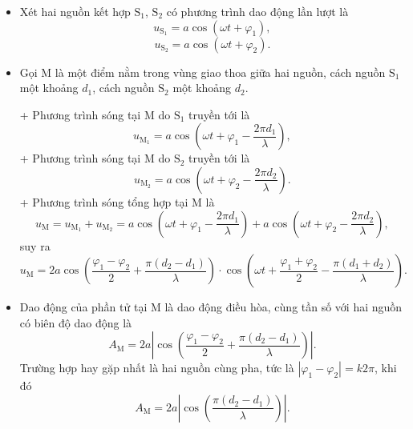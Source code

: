 \begin{itemize}
	\item Xét hai nguồn kết hợp $\text{S}_1$, $\text{S}_2$ có phương trình dao động lần lượt là 
	\begin{equation*}
		u_{\text{S}_1} = a \cos (\omega t + \varphi_1),
	\end{equation*}
	\begin{equation*}
		u_{\text{S}_2} = a \cos (\omega t + \varphi_2).
	\end{equation*}
	\item Gọi M là một điểm nằm trong vùng giao thoa giữa hai nguồn, cách nguồn $\text{S}_1$ một khoảng $d_1$, cách nguồn $\text{S}_2$ một khoảng $d_2$. 
	
	+ Phương trình sóng tại M do $\text{S}_1$ truyền tới là 
	\begin{equation*}
		u_{\text{M}_1} = a \cos \left(\omega t + \varphi_1 -\dfrac{2\pi d_1}{\lambda}\right),
	\end{equation*}
	+ Phương trình sóng tại M do $\text{S}_2$ truyền tới là 
	\begin{equation*}
		u_{\text{M}_2} = a \cos \left(\omega t + \varphi_2 -\dfrac{2\pi d_2}{\lambda}\right).
	\end{equation*}
	+ Phương trình sóng tổng hợp tại M là
	\begin{equation*}
		u_{\text{M}}=u_{\text{M}_1} + u_{\text{M}_2} = a \cos \left(\omega t + \varphi_1 -\dfrac{2\pi d_1}{\lambda}\right)+ a \cos \left(\omega t + \varphi_2 -\dfrac{2\pi d_2}{\lambda}\right), 
	\end{equation*}
	suy ra
	\begin{equation*}
		u_{\text{M}} = 2a \cos \left(\dfrac{\varphi_1 - \varphi_2}{2} + \dfrac{\pi (d_2-d_1)}{\lambda}\right) \cdot  \cos \left(\omega t +\dfrac{\varphi_1 + \varphi_2}{2} - \dfrac{\pi (d_1+d_2)}{\lambda}\right).
	\end{equation*}
	\item  Dao động của phần tử tại M là dao động điều hòa, cùng tần số với hai nguồn có biên độ dao động là
	\begin{equation*}
		A_{\text{M}} = 2a\left|\cos \left(\dfrac{\varphi_1 - \varphi_2}{2} + \dfrac{\pi (d_2-d_1)}{\lambda}\right)\right|.
	\end{equation*}
	Trường hợp hay gặp nhất là hai nguồn cùng pha, tức là $|\varphi_1 - \varphi_2| =k2\pi$, khi đó 
	\begin{equation*}
		A_{\text{M}} = 2a\left|\cos \left(\dfrac{\pi (d_2-d_1)}{\lambda}\right)\right|.
	\end{equation*}
\end{itemize}
